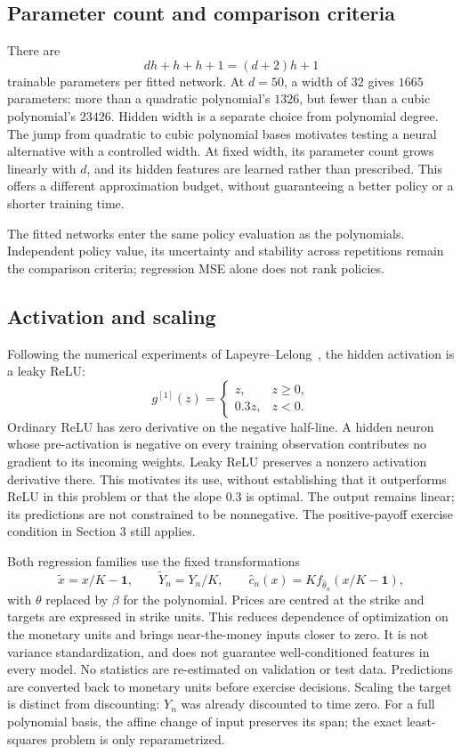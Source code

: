 \documentclass[11pt,a4paper]{article}
\begin{document}
\subsection{Parameter count and comparison criteria}
There are
\[
 dh+h+h+1=(d+2)h+1
\]
trainable parameters per fitted network. At $d=50$, a width of $32$ gives $1665$
parameters: more than a quadratic polynomial's $1326$, but fewer than a cubic
polynomial's $23426$. Hidden width is a separate choice from polynomial degree.
The jump from quadratic to cubic polynomial bases motivates testing a neural
alternative with a controlled width. At fixed width, its parameter count grows
linearly with $d$, and its hidden features are learned rather than prescribed.
This offers a different approximation budget, without guaranteeing a better
policy or a shorter training time.

The fitted networks enter the same policy evaluation as the polynomials.
Independent policy value, its uncertainty and stability across repetitions
remain the comparison criteria; regression MSE alone does not rank policies.

\subsection{Activation and scaling}
Following the numerical experiments of Lapeyre--Lelong~\cite{LL}, the hidden
activation is a leaky ReLU:
\[
 g^{[1]}(z)=\begin{cases}z,&z\geq0,\\0.3z,&z<0.\end{cases}
\]
Ordinary ReLU has zero derivative on the negative half-line. A hidden neuron
whose pre-activation is negative on every training observation contributes no
gradient to its incoming weights. Leaky ReLU preserves a nonzero activation
derivative there. This motivates its use, without establishing that it outperforms
ReLU in this problem or that the slope $0.3$ is optimal. The output remains linear;
its predictions are not constrained to be nonnegative. The positive-payoff
exercise condition in Section 3 still applies.

Both regression families use the fixed transformations
\begin{equation}\label{eq:scaling}
 \widetilde x=x/K-\mathbf 1,\qquad \widetilde Y_n=Y_n/K,
 \qquad \widehat c_n(x)=K f_{\widehat\theta_n}(x/K-\mathbf 1),
\end{equation}
with $\theta$ replaced by $\beta$ for the polynomial. Prices are centred at the
strike and targets are expressed in strike units. This reduces dependence of
optimization on the monetary units and brings near-the-money inputs closer to
zero. It is not variance standardization, and does not guarantee well-conditioned
features in every model. No statistics are re-estimated on validation or test data.
Predictions are converted back to monetary units before exercise decisions.
Scaling the target is distinct from discounting: $Y_n$ was already discounted to
time zero. For a full polynomial basis, the affine change of input preserves its
span; the exact least-squares problem is only reparametrized.
\end{document}
